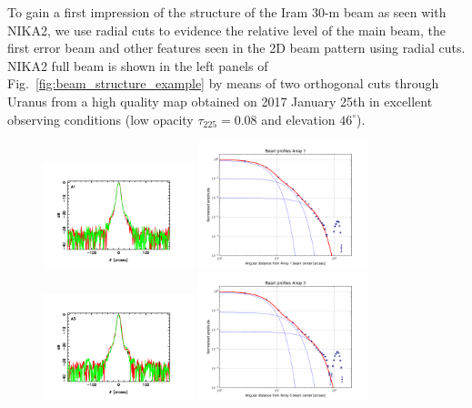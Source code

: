 To gain a first impression of the structure of the Iram 30-m beam as
seen with NIKA2, we use radial cuts to evidence the relative level of
the main beam, the first error beam and other features seen in the 2D
beam pattern using radial cuts. NIKA2 full beam is shown in the left
panels of Fig.~\ref{fig:beam_structure_example} by means of two
orthogonal cuts through Uranus from a high quality map obtained on
2017 January 25th in excellent observing conditions
(low opacity $\tau_{225}=0.08$ and elevation $46^{\circ}$).


\begin{figure}[ht!]
  \begin{center}
    \includegraphics[clip=true, width=0.39\textwidth]{Figures/Array_A1_dB.pdf}
    \includegraphics[clip=true, trim={-0.5cm, -0.65cm, 0, 0}, width=0.44\textwidth]{Figures/Beam_profiles_A1_FR.pdf}
    \includegraphics[clip=true, width=0.39\textwidth]{Figures/Array_A3_dB.pdf}
    \includegraphics[clip=true, trim={-0.5cm, -0.65cm, 0, 0}, width=0.44\textwidth]{Figures/Beam_profiles_A3_FR.pdf}

\end{center}
\end{figure}
